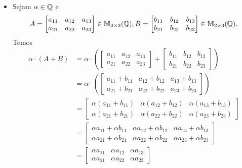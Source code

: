 \begin{exemplo}
\begin{enumerate}[label={\arabic*})]
\begin{solucao}
\begin{itemize}
				      \item Sejam $\alpha \in \mathbb{Q}$ e
				            \[
					            A = \begin{bmatrix} a_{11} & a_{12} & a_{13}\\a_{21} & a_{22} & a_{23}\end{bmatrix} \in \mathbb{M}_{2 \times 3}(\mathbb{Q}),
					            B = \begin{bmatrix} b_{11} & b_{12} & b_{13}\\b_{21} & b_{22} & b_{23}\end{bmatrix} \in \mathbb{M}_{2 \times 3}(\mathbb{Q}).
				            \]
				            Temos
				            \begin{align*}
					            \alpha\cdot(A + B) & = \alpha\cdot\left(
					            \begin{bmatrix} a_{11} & a_{12} & a_{13}\\a_{21} & a_{22} & a_{23}\end{bmatrix} +
					            \begin{bmatrix} b_{11} & b_{12} & b_{13}\\b_{21} & b_{22} & b_{23}\end{bmatrix}\right)
					            \\ &= \alpha\cdot\left(\begin{bmatrix} a_{11} + b_{11} & a_{12} + b_{12} & a_{13} + b_{13}\\a_{21} + b_{21} & a_{22} + b_{22} & a_{23} + b_{23}\end{bmatrix}\right)
					            \\ &= \begin{bmatrix} \alpha(a_{11} + b_{11}) & \alpha(a_{12} + b_{12}) & \alpha(a_{13} + b_{13})\\\alpha(a_{21} + b_{21}) & \alpha(a_{22} + b_{22}) & \alpha(a_{23} + b_{23})\end{bmatrix}
					            \\ &= \begin{bmatrix} \alpha a_{11} + \alpha b_{11} & \alpha a_{12} + \alpha b_{12} & \alpha a_{13} + \alpha b_{13}\\\alpha a_{21} + \alpha b_{21} & \alpha a_{22} + \alpha b_{22} & \alpha a_{23} + \alpha b_{23}\end{bmatrix}
					            \\ &= \begin{bmatrix} \alpha a_{11} & \alpha a_{12} & \alpha a_{13} \\ \alpha a_{21} & \alpha a_{22} & \alpha a_{23} \end{bmatrix}

\end{align*}
\end{itemize}
\end{solucao}
\end{enumerate}
\end{exemplo}
